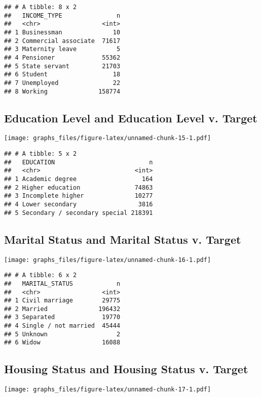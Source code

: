 \documentclass[]{article}
\begin{document}
\begin{verbatim}
## # A tibble: 8 x 2
##   INCOME_TYPE               n
##   <chr>                 <int>
## 1 Businessman              10
## 2 Commercial associate  71617
## 3 Maternity leave           5
## 4 Pensioner             55362
## 5 State servant         21703
## 6 Student                  18
## 7 Unemployed               22
## 8 Working              158774
\end{verbatim}

\subsection{Education Level and Education Level v.
Target}\label{education-level-and-education-level-v.-target}

\texttt{[image: graphs\_files/figure-latex/unnamed-chunk-15-1.pdf]}

\begin{verbatim}
## # A tibble: 5 x 2
##   EDUCATION                          n
##   <chr>                          <int>
## 1 Academic degree                  164
## 2 Higher education               74863
## 3 Incomplete higher              10277
## 4 Lower secondary                 3816
## 5 Secondary / secondary special 218391
\end{verbatim}

\subsection{Marital Status and Marital Status v.
Target}\label{marital-status-and-marital-status-v.-target}

\texttt{[image: graphs\_files/figure-latex/unnamed-chunk-16-1.pdf]}

\begin{verbatim}
## # A tibble: 6 x 2
##   MARITAL_STATUS            n
##   <chr>                 <int>
## 1 Civil marriage        29775
## 2 Married              196432
## 3 Separated             19770
## 4 Single / not married  45444
## 5 Unknown                   2
## 6 Widow                 16088
\end{verbatim}

\subsection{Housing Status and Housing Status v.
Target}\label{housing-status-and-housing-status-v.-target}

\texttt{[image: graphs\_files/figure-latex/unnamed-chunk-17-1.pdf]}
\end{document}
